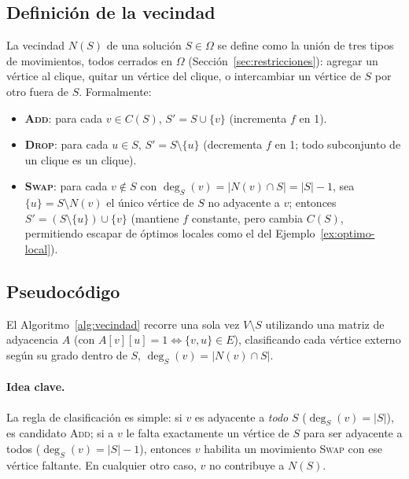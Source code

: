 \documentclass[letterpaper,12pt]{article}
\begin{document}
\subsection{Definición de la vecindad}

La vecindad $N(S)$ de una solución $S \in \Omega$ se define como la unión de tres tipos de movimientos, todos cerrados en $\Omega$ (Sección~\ref{sec:restricciones}): agregar un vértice al clique, quitar un vértice del clique, o intercambiar un vértice de $S$ por otro fuera de $S$. Formalmente:

\begin{itemize}
    \item \textbf{\textsc{Add}}: para cada $v \in C(S)$, $S' = S \cup \{v\}$ (incrementa $f$ en 1).
    \item \textbf{\textsc{Drop}}: para cada $u \in S$, $S' = S \setminus \{u\}$ (decrementa $f$ en 1; todo subconjunto de un clique es un clique).
    \item \textbf{\textsc{Swap}}: para cada $v \notin S$ con $\deg_S(v) = |N(v)\cap S| = |S|-1$, sea $\{u\} = S \setminus N(v)$ el único vértice de $S$ no adyacente a $v$; entonces $S' = (S \setminus \{u\}) \cup \{v\}$ (mantiene $f$ constante, pero cambia $C(S)$, permitiendo escapar de óptimos locales como el del Ejemplo~\ref{ex:optimo-local}).
\end{itemize}

\subsection{Pseudocódigo}

El Algoritmo~\ref{alg:vecindad} recorre una sola vez $V \setminus S$ utilizando una matriz de adyacencia $A$ (con $A[v][u]=1 \Leftrightarrow \{v,u\}\in E$), clasificando cada vértice externo según su grado dentro de $S$, $\deg_S(v) = |N(v)\cap S|$.

\paragraph{Idea clave.} La regla de clasificación es simple: si $v$ es adyacente a \emph{todo} $S$ ($\deg_S(v)=|S|$), es candidato \textsc{Add}; si a $v$ le falta exactamente un vértice de $S$ para ser adyacente a todos ($\deg_S(v)=|S|-1$), entonces $v$ habilita un movimiento \textsc{Swap} con ese vértice faltante. En cualquier otro caso, $v$ no contribuye a $N(S)$.
\end{document}
